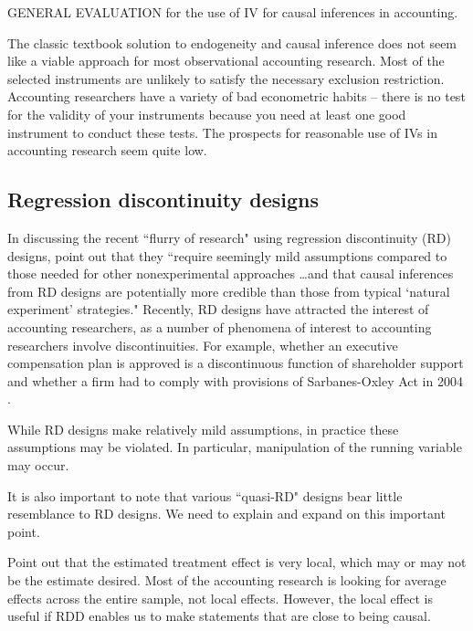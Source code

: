 \documentclass[11pt]{amsart}
\begin{document}
GENERAL EVALUATION for the use of IV for causal inferences in accounting.  

The classic textbook solution to endogeneity and causal inference does not seem like a viable approach for most observational accounting research.  Most of the selected instruments are unlikely to satisfy the necessary exclusion restriction.  Accounting researchers have a variety of bad econometric habits -- there is no test for the validity of your instruments because you need at least one good instrument to conduct these tests.  The prospects for reasonable use of IVs in accounting research seem quite low.

\subsection{Regression discontinuity designs} 

In discussing the recent ``flurry of research" using regression discontinuity (RD) designs, \citet[p.282]{Lee:2010hya} point out that they ``require seemingly mild assumptions compared to those needed for other nonexperimental approaches \dots and that causal inferences from RD designs are potentially more credible than those from typical `natural experiment' strategies." 
Recently, RD designs have attracted the interest of accounting researchers, as a number of phenomena of interest to accounting researchers involve discontinuities. For example, whether an executive compensation plan is approved is a discontinuous function of shareholder support \citet{Armstrong:2013io} and whether a firm had to comply with provisions of Sarbanes-Oxley Act in 2004 \citep{Iliev:2010ic}.

While RD designs make relatively mild assumptions, in practice these assumptions may be violated. In particular, manipulation of the running variable may occur.

It is also important to note that various ``quasi-RD" designs bear little resemblance to RD designs. We need to explain and expand on this important point.

Point out that the estimated treatment effect is very local, which may or may not be the estimate desired.  Most of the accounting research is looking for average effects across the entire sample, not local effects.  However, the local effect is useful if RDD enables us to make statements that are close to being causal.
\end{document}
